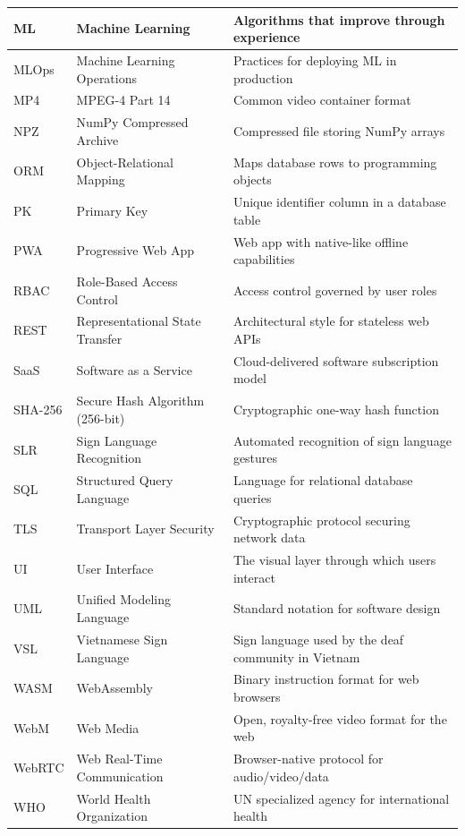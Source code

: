 \begin{longtable}{|p{2.2cm}|p{5.8cm}|p{5.4cm}|}
ML      & Machine Learning & Algorithms that improve through experience \\ \hline
MLOps   & Machine Learning Operations & Practices for deploying ML in production \\ \hline
MP4     & MPEG-4 Part 14 & Common video container format \\ \hline
NPZ     & NumPy Compressed Archive & Compressed file storing NumPy arrays \\ \hline
ORM     & Object-Relational Mapping & Maps database rows to programming objects \\ \hline
PK      & Primary Key & Unique identifier column in a database table \\ \hline
PWA     & Progressive Web App & Web app with native-like offline capabilities \\ \hline
RBAC    & Role-Based Access Control & Access control governed by user roles \\ \hline
REST    & Representational State Transfer & Architectural style for stateless web APIs \\ \hline
SaaS    & Software as a Service & Cloud-delivered software subscription model \\ \hline
SHA-256 & Secure Hash Algorithm (256-bit) & Cryptographic one-way hash function \\ \hline
SLR     & Sign Language Recognition & Automated recognition of sign language gestures \\ \hline
SQL     & Structured Query Language & Language for relational database queries \\ \hline
TLS     & Transport Layer Security & Cryptographic protocol securing network data \\ \hline
UI      & User Interface & The visual layer through which users interact \\ \hline
UML     & Unified Modeling Language & Standard notation for software design \\ \hline
VSL     & Vietnamese Sign Language & Sign language used by the deaf community in Vietnam \\ \hline
WASM    & WebAssembly & Binary instruction format for web browsers \\ \hline
WebM    & Web Media & Open, royalty-free video format for the web \\ \hline
WebRTC  & Web Real-Time Communication & Browser-native protocol for audio/video/data \\ \hline
WHO     & World Health Organization & UN specialized agency for international health \\ \hline
\end{longtable}
\normalsize
